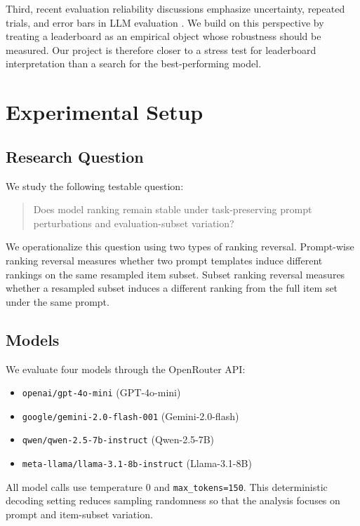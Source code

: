 \documentclass[11pt]{article}
\begin{document}
Third, recent evaluation reliability discussions emphasize uncertainty, repeated trials, and error bars in LLM evaluation \cite{miller2024errorbars, fourrier2024openllm}. We build on this perspective by treating a leaderboard as an empirical object whose robustness should be measured. Our project is therefore closer to a stress test for leaderboard interpretation than a search for the best-performing model.

\section{Experimental Setup}

\subsection{Research Question}

We study the following testable question:
\begin{quote}
Does model ranking remain stable under task-preserving prompt perturbations and evaluation-subset variation?
\end{quote}

We operationalize this question using two types of ranking reversal. Prompt-wise ranking reversal measures whether two prompt templates induce different rankings on the same resampled item subset. Subset ranking reversal measures whether a resampled subset induces a different ranking from the full item set under the same prompt.

\subsection{Models}

We evaluate four models through the OpenRouter API:
\begin{itemize}[leftmargin=*]
    \item \texttt{openai/gpt-4o-mini} (GPT-4o-mini)
    \item \texttt{google/gemini-2.0-flash-001} (Gemini-2.0-flash)
    \item \texttt{qwen/qwen-2.5-7b-instruct} (Qwen-2.5-7B)
    \item \texttt{meta-llama/llama-3.1-8b-instruct} (Llama-3.1-8B)
\end{itemize}

All model calls use temperature $0$ and \texttt{max\_tokens=150}. This deterministic decoding setting reduces sampling randomness so that the analysis focuses on prompt and item-subset variation.
\end{document}
